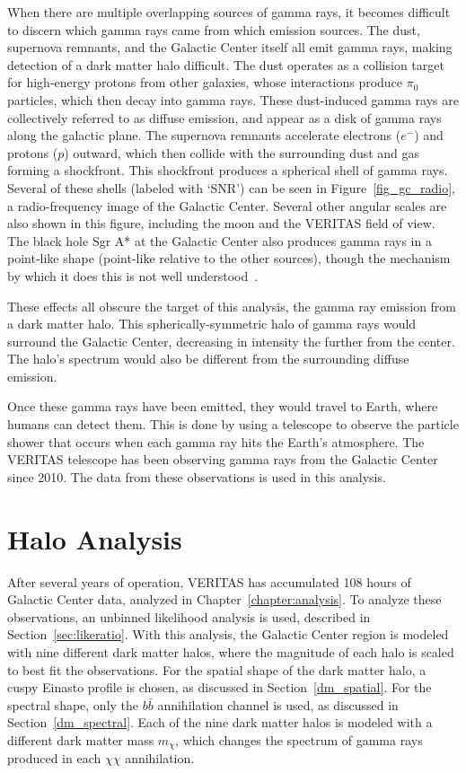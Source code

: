   When there are multiple overlapping sources of gamma rays, it becomes difficult to discern which gamma rays came from which emission sources.
  The dust, supernova remnants, and the Galactic Center itself all emit gamma rays, making detection of a dark matter halo difficult.
  The dust operates as a collision target for high-energy protons from other galaxies, whose interactions produce $\pi_0$ particles, which then decay into gamma rays.
  These dust-induced gamma rays are collectively referred to as diffuse emission, and appear as a disk of gamma rays along the galactic plane.
  The supernova remnants accelerate electrons ($e^{-}$) and protons ($p$) outward, which then collide with the surrounding dust and gas forming a shockfront.
  This shockfront produces a spherical shell of gamma rays.
  Several of these shells (labeled with `SNR') can be seen in Figure~\ref{fig_gc_radio}, a radio-frequency image of the Galactic Center.
  Several other angular scales are also shown in this figure, including the moon and the VERITAS field of view.
  The black hole Sgr A* at the Galactic Center also produces gamma rays in a point-like shape (point-like relative to the other sources), though the mechanism by which it does this is not well understood~\cite{gal_cent_still_undetermined}.

  These effects all obscure the target of this analysis, the gamma ray emission from a dark matter halo.
  This spherically-symmetric halo of gamma rays would surround the Galactic Center, decreasing in intensity the further from the center.
  The halo's spectrum would also be different from the surrounding diffuse emission.

  Once these gamma rays have been emitted, they would travel to Earth, where humans can detect them.
  This is done by using a telescope to observe the particle shower that occurs when each gamma ray hits the Earth's atmosphere.
  The VERITAS telescope has been observing gamma rays from the Galactic Center since 2010.
  The data from these observations is used in this analysis.

\FloatBarrier

\section{Halo Analysis}
  After several years of operation, VERITAS has accumulated 108 hours of Galactic Center data, analyzed in Chapter~\ref{chapter:analysis}.
  To analyze these observations, an unbinned likelihood analysis is used, described in Section~\ref{sec:likeratio}.
  With this analysis, the Galactic Center region is modeled with nine different dark matter halos, where the magnitude of each halo is scaled to best fit the observations.
  For the spatial shape of the dark matter halo, a cuspy Einasto profile is chosen, as discussed in Section~\ref{dm_spatial}.
  For the spectral shape, only the $b\bar{b}$ annihilation channel is used, as discussed in Section~\ref{dm_spectral}.
  Each of the nine dark matter halos is modeled with a different dark matter mass $m_{\chi}$, which changes the spectrum of gamma rays produced in each $\chi\chi$ annihilation.
  
